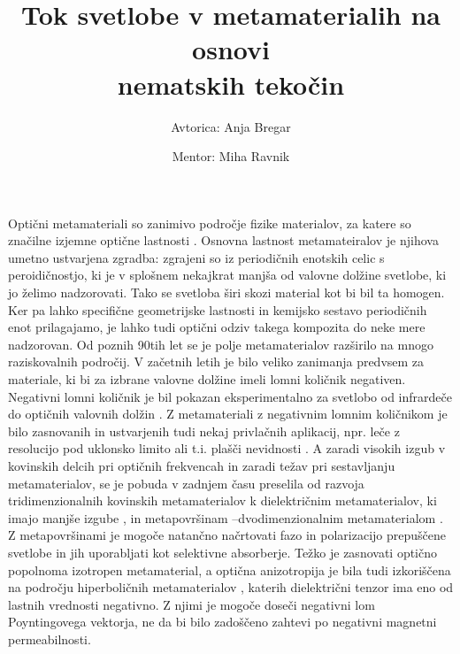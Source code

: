 \documentclass[a4paper,11pt]{article}
\title{\huge{Tok svetlobe v metamaterialih na osnovi \\nematskih tekočin}}
\author{Avtorica: Anja Bregar \and Mentor: Miha Ravnik}
\begin{document}
\onehalfspacing

\maketitle



Optični metamateriali so zanimivo področje fizike materialov, za katere so značilne izjemne optične lastnosti \cite{wegener-2011-nature-review}.
Osnovna lastnost metamateiralov je njihova umetno ustvarjena zgradba: zgrajeni so iz periodičnih enotskih celic s peroidičnostjo, ki je v splošnem nekajkrat manjša od valovne dolžine svetlobe, ki jo želimo nadzorovati.
Tako se svetloba širi skozi material kot bi bil ta homogen. 
Ker pa lahko specifične geometrijske lastnosti in kemijsko sestavo periodičnih enot prilagajamo, je lahko tudi optični odziv takega kompozita do neke mere nadzorovan.
Od poznih 90tih let se je polje metamaterialov razširilo na mnogo raziskovalnih področij. 
V začetnih letih je bilo veliko zanimanja predvsem za materiale, ki bi za izbrane valovne dolžine imeli lomni količnik negativen. 
Negativni lomni količnik je bil pokazan eksperimentalno za svetlobo od infrardeče do optičnih valovnih dolžin \cite{schultz-2000-first-mtm,zhang-2008-fishnet}. 
Z metamateriali z negativnim lomnim količnikom je bilo zasnovanih in ustvarjenih tudi nekaj privlačnih aplikacij, npr. leče z resolucijo pod uklonsko limito ali t.i. plašči nevidnosti \cite{capasso-2016-metalens,zhang-2015-skin-cloak}. 
A zaradi visokih izgub v kovinskih delcih pri optičnih frekvencah in zaradi težav pri sestavljanju metamaterialov, se je pobuda v zadnjem času preselila od razvoja tridimenzionalnih kovinskih metamaterialov k dielektričnim metamaterialov, ki imajo manjše izgube \cite{jacob-2016-all-dielectric}, in metapovršinam --dvodimenzionalnim metamaterialom \cite{capasso-2014-flat-optics-metasurface}. 
Z metapovršinami je mogoče natančno načrtovati fazo in polarizacijo prepuščene svetlobe \cite{capasso-2014-flat-optics-metasurface} in jih uporabljati kot selektivne absorberje.
Težko je zasnovati optično popolnoma izotropen metamaterial, a optična anizotropija je bila tudi izkoriščena na področju hiperboličnih metamaterialov \cite{kivshar-2013-hyperbolic}, katerih dielektrični tenzor ima eno od lastnih vrednosti negativno. 
Z njimi je mogoče doseči negativni lom Poyntingovega vektorja, ne da bi bilo zadoščeno zahtevi po negativni magnetni permeabilnosti. 


\end{document}

